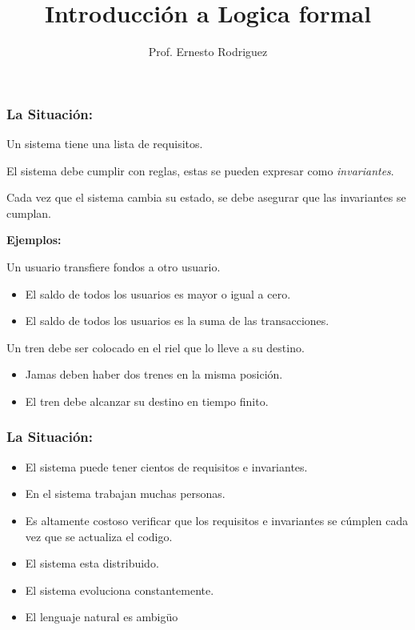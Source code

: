 \documentclass{beamer}
\title{Introducci\'on a Logica formal}
\author{Prof. Ernesto Rodriguez}
\institute{
    Universidad del Itsmo \\
    \medskip \textit{erodriguez@unis.edu.gt}
}
\date[\today]{}
\begin{document}
\begin{frame}
\titlepage
\end{frame}

\begin{frame}
    \frametitle{La Situaci\'on:}
    \begin{itemize}
        \item{Un sistema tiene una lista de requisitos.}
        \item{El sistema debe cumplir con reglas, estas se pueden expresar como \emph{invariantes}.}
        \item{Cada vez que el sistema cambia su estado, se debe asegurar que las invariantes se cumplan.}
        \item{{\bf Ejemplos:}
            \begin{itemize}
                \item{Un usuario transfiere fondos a otro usuario.
                    \begin{itemize}
                        \item{El saldo de todos los usuarios es mayor o igual a cero.}
                        \item{El saldo de todos los usuarios es la suma de las transacciones.}
                    \end{itemize}
                \item{Un tren debe ser colocado en el riel que lo lleve a su destino.
                    \begin{itemize}
                        \item{Jamas deben haber dos trenes en la misma posici\'on.}
                        \item{El tren debe alcanzar su destino en tiempo finito.}
                    \end{itemize}
                }
                }
            \end{itemize}
        }
    \end{itemize}

\end{frame}

\begin{frame}
    \frametitle{La Situaci\'on:}
    \begin{itemize}
        \item{El sistema puede tener cientos de requisitos e invariantes.}
        \item{En el sistema trabajan muchas personas.}
        \item{Es altamente costoso verificar que los requisitos e
            invariantes se c\'umplen cada vez que se actualiza el codigo.}
        \item{El sistema esta distribuido.}
        \item{El sistema evoluciona constantemente.}
        \item{El lenguaje natural es ambig\"uo}
    \end{itemize}
\end{frame}
\end{document}
